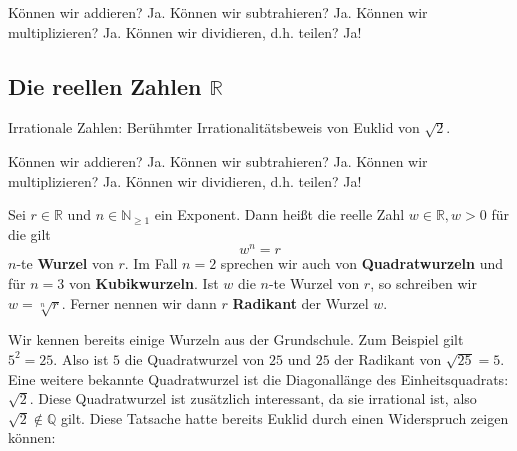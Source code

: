 Können wir addieren? Ja. Können wir subtrahieren? Ja. Können wir multiplizieren? Ja. Können wir dividieren, d.h. teilen? Ja!

\subsection{Die reellen Zahlen \(\mathbb R\)}
Irrationale Zahlen: Berühmter Irrationalitätsbeweis von Euklid von \(\sqrt{2}\). 

Können wir addieren? Ja. Können wir subtrahieren? Ja. Können wir multiplizieren? Ja. Können wir dividieren, d.h. teilen? Ja!

\begin{definition}
    Sei \(r \in \mathbb R\) und \( n \in \mathbb N_{\geq 1}\) ein Exponent. Dann heißt die reelle Zahl \(w \in \mathbb R, w>0\) für die gilt 
    \begin{equation*}
        w^n = r
    \end{equation*}
    \(n\)-te \textbf{Wurzel} von \(r\). Im Fall \(n=2\) sprechen wir auch von \textbf{Quadratwurzeln} und für \(n=3\) von \textbf{Kubikwurzeln}. Ist \(w\) die \(n\)-te Wurzel von \(r\), so schreiben wir \(w = \sqrt[n]{r}\). Ferner nennen wir dann \(r\) \textbf{Radikant} der Wurzel \(w\).  
\end{definition}
Wir kennen bereits einige Wurzeln aus der Grundschule. Zum Beispiel gilt \(5^2 = 25\). Also ist \(5\) die Quadratwurzel von \(25\) und \(25\) der Radikant von \(\sqrt{25}=5\). Eine weitere bekannte Quadratwurzel ist die Diagonallänge des Einheitsquadrats: \(\sqrt{2}\). Diese Quadratwurzel ist zusätzlich interessant, da sie irrational ist, also \(\sqrt{2}\notin \mathbb Q\) gilt. Diese Tatsache hatte bereits Euklid durch einen Widerspruch zeigen können: 

